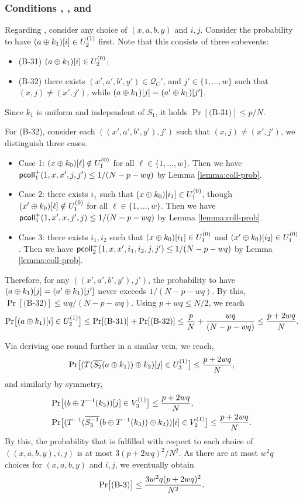 \documentclass[journal=tosc,final,nohyperref]{iacrtrans}
\begin{document}

%

\subsubsection{Conditions \bthree, \bfour, and \bfive}


Regarding \bthree, consider any choice of $(x,a,b,y)$ and $i, j$. Consider the probability to have $(a\oplus k_1)[i]\in U_2^{(1)}$ first. Note that this consists of three subevents:
\begin{itemize}
	\item(B-31) $(a\oplus k_1)[i]\in U_2^{(0)}$;
	\item(B-32) there exists $(x',a',b',y')\in\mathcal{Q}_{C}'$, and $j'\in\{1,\ldots,w\}$ such that $(x,j)\neq(x',j')$, while $(a\oplus k_1)[j]=(a'\oplus k_1)[j']$.
\end{itemize}
Since $k_1$ is uniform and independent of $S_1$, it holds $\Pr[\text{(B-31)}]\leq p/N$.


For (B-32), consider each $((x',a',b',y'),j')$ such that $(x,j)\neq(x',j')$, we distinguish three cases.
\begin{itemize}
	\item Case 1: $(x\oplus k_0)[\ell]\notin U_1^{(0)}$ for all $\ell\in\{1,\ldots,w\}$. Then we have $\mathsf{pcoll}_{1}^+(1,x,x',j,j')\leq1/(N-p-wq)$ by Lemma \ref{lemma:coll-prob}.
	\item Case 2: there exists $i_1$ such that $(x\oplus k_0)[i_1]\in U_1^{(0)}$, though $(x'\oplus k_0)[\ell]\notin U_1^{(0)}$ for all $\ell\in\{1,\ldots,w\}$. Then we have $\mathsf{pcoll}_{1}^+(1,x',x,j',j)\leq1/(N-p-wq)$ by Lemma \ref{lemma:coll-prob}.
	\item Case 3: there exists $i_1,i_2$ such that $(x\oplus k_0)[i_1]\in U_1^{(0)}$ and $(x'\oplus k_0)[i_2]\in U_1^{(0)}$. Then we have  $\mathsf{pcoll}_{2}^+(1,x,x',i_1,i_2,j,j')\leq1/(N-p-wq)$ by Lemma \ref{lemma:coll-prob}.
\end{itemize}
%
Therefore, for any $((x',a',b',y'),j')$, the probability to have $(a\oplus k_1)[j]=(a'\oplus k_1)[j']$ never exceeds $1/(N-p-wq)$. By this, $\Pr[\text{(B-32)}]\leq wq/(N-p-wq)$. Using $p+wq\leq N/2$, we reach
%
$${\Pr}\big[(a\oplus k_1)[i]\in U_2^{(1)}\big]
\leq\Pr[\text{(B-31)}]+\Pr[\text{(B-32)}]\leq
\frac{p}{N}+\frac{wq}{(N-p-wq)}\leq\frac{p+2wq}{N}.$$
%

Via deriving one round further in a similar vein, we reach,
%
$${\Pr}\big[(T(\overline{S_2}(a \oplus k_1))\oplus k_2)[j]\in U_{3}^{(1)}\big]\leq\frac{p+2wq}{N},$$
%
and similarly by symmetry,
%
\begin{align*}
&{\Pr}\big[(b\oplus T^{-1}(k_3))[j]\in V_3^{(1)}\big]\leq\frac{p+2wq}{N},       \\
&{\Pr}\big[(T^{-1}(\overline{S_3^{-1}}(b\oplus T^{-1}(k_3))\oplus k_2))[i]\in V_2^{(1)}\big]\leq\frac{p+2wq}{N}.
\end{align*}
%
By this, the probability that \bthree is fulfilled with respect to each choice of $((x,a,b,y),i, j)$ is at most $3(p+2wq)^2/N^2$. As there are at most $w^2q$ choices for $(x,a,b,y)$ and $i, j$, we eventually obtain
%
$$
{\Pr}\big[\text{(B-3)}\big] \leq \frac{3w^2q(p+2wq)^2}{N^2}.
$$
\end{document}
